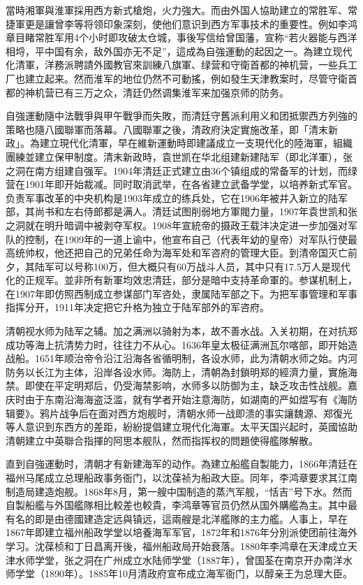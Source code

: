 當時湘軍與淮軍採用西方新式槍炮，火力強大。而由外国人協助建立的常胜军、常捷軍更是讓曾李等将领印象深刻，使他们意识到西方军事技术的重要性。例如李鸿章目睹常胜军用4个小时即攻破太仓城，事後写信给曾国藩，宣称“若火器能与西洋相埒，平中国有余，敌外国亦无不足”，這成為自強運動的起因之一。為建立现代化清軍，洋務派聘請外國教官來訓練八旗軍、绿营和守衛首都的神机营，一些兵工厂也建立起来。然而淮军的地位仍然不可動搖，例如發生天津教案时，尽管守衛首都的神机营已有三万之众，清廷仍然调集淮军来加强京师的防务。

自強運動隨中法戰爭與甲午戰爭而失敗，而清廷守舊派利用义和团抵禦西方列強的策略也隨八國聯軍而落幕。八國聯軍之後，清政府決定實施改革，即「清末新政」。為建立現代化清軍，早在維新運動時即建議成立一支現代化的陸海軍，組織團練並建立保甲制度。清末新政時，袁世凯在华北组建新建陆军（即北洋軍），张之洞在南方组建自强军。1904年清廷正式建立由36个镇组成的常备军的计划，而绿营在1901年即开始裁减。同时取消武举，在各省建立武备学堂，以培养新式军官。负责军事改革的中央机构是1903年成立的练兵处，它在1906年被并入新立的陆军部，其尚书和左右侍郎都是满人。清廷试图削弱地方軍閥力量，1907年袁世凯和张之洞就在明升暗调中被剥夺军权。1908年宣統帝的摄政王载沣决定进一步加强对军队的控制，在1909年的一道上谕中，他宣布自己（代表年幼的皇帝）对军队行使最高统帅权，他还把自己的兄弟任命为海军处和军咨府的管理大臣。到清帝国灭亡前夕，其陆军可以号称100万，但大概只有60万战斗人员，其中只有17.5万人是现代化的正规军。並非所有新軍均效忠清廷，部分是暗中支持革命軍的。参谋机制上，在1907年即仿照西制成立参谋部门军咨处，隶属陆军部之下。为把军事管理和军事指挥分开，1911年决定把它升格为独立于陆军部外的军咨府。

清朝视水师为陆军之辅。加之满洲以骑射为本，故不善水战。入关初期，在对抗郑成功等海上抗清势力时，往往力不从心。1636年皇太极征满洲瓦尔喀部，即开始造战船。1651年顺治帝令沿江沿海各省循明制，各设水师，此为清朝水师之始。内河防务以长江为主体，沿岸各设水师。海防上，清朝為封鎖明郑的經濟力量，實施海禁。即使在平定明郑后，仍受海禁影响，水师多以防御为主，缺乏攻击性战舰。嘉庆时由于东南沿海海盗泛滥，就有学者开始注意海防，如湖南的严如煜写有《海防辑要》。鸦片战争后在面对西方炮舰时，清朝水师一战即溃的事实讓魏源、郑復光等人意识到东西方的差距，紛紛提倡建立現代化海軍。太平天国兴起时，英國協助清朝建立中英聯合指揮的阿思本舰队，然而指挥权的問題使得艦隊解散。

直到自強運動时，清朝才有新建海军的动作。為建立船艦自製能力，1866年清廷在福州马尾成立总理船政事务衙门，以沈葆祯为船政大臣。同年，李鸿章要求其江南制造局建造炮舰。1868年8月，第一艘中国制造的蒸汽军舰，“恬吉”号下水。然而自製船艦与外国艦隊相比較差也較貴，李鸿章等官员仍然从国外購艦為主。其中最有名的即是由德國建造定远與镇远，這兩艘是北洋艦隊的主力艦。人事上，早在1867年即建立福州船政学堂以培養海军军官，1872年和1876年分別派使团前往海外学习。沈葆桢和丁日昌离开後，福州船政局开始衰落。1880年李鸿章在天津成立天津水师学堂，张之洞在广州成立水陆师学堂（1887年），曾国荃在南京开办南洋水师学堂（1890年）。1885年10月清政府宣布成立海军衙门，以醇亲王为总理大臣。

